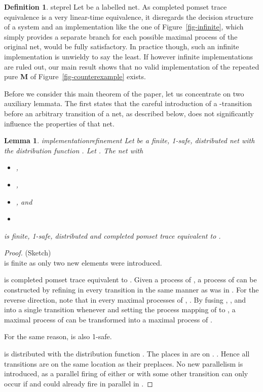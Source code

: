 \documentclass[submission,copyright,creativecommons]{eptcs}
\newtheorem{lemma}{Lemma}
\theoremstyle{definition}
\newtheorem{definition}{Definition}
\def\figurename{Figure}
\newcommand{\reffig}[1]{\figurename~\ref{fig-#1}}
\begin{document}
\begin{definition}{steprel}{
  Let  be a labelled net.
  }
As completed pomset trace equivalence is a very linear-time equivalence,
it disregards the decision structure of a system and
an implementation like the one of \reffig{infinite}, which simply provides a separate branch for each possible maximal process of the original net, would be fully
satisfactory. In practice though, such an infinite implementation is unwieldy to
say the least. If however infinite implementations are ruled out,
our main result shows that
no valid implementation
of the repeated pure \textbf{M} of \reffig{counterexample} exists.

Before we consider this main theorem of the paper, let us concentrate on two
auxiliary lemmata. The first
states that the careful introduction of a
-transition before an arbitrary transition of a net, as described below,
does not significantly influence the properties of that net.

\begin{lemma}{implementationrefinement}{
  Let  be a finite, 1-safe, distributed net with
  the distribution function . Let .
  }
  The net  with
  \begin{itemize}\vspace{-1ex}
    \item ,
    \item ,
    \item , and
    \item 
  \end{itemize}
  is finite, 1-safe, distributed and completed pomset trace equivalent to .
\end{lemma}

\begin{proof}(Sketch)\\
   is finite as only two new elements were introduced.

   is completed pomset trace equivalent to . Given a process  of , a process of  can be constructed by refining in  every
  transition  in the same manner as  was in .
  For the reverse direction, note that in every maximal processes of ,
  .
  By fusing , , and  into a single
  transition  whenever  and setting the process mapping of  to ,
  a maximal process of  can be transformed into a maximal process of .

  For the same reason,  is also 1-safe.

  \noindent
   is distributed with the distribution function
  .
  The places in  are on . .
  Hence all transitions are on the same location as their preplaces.
  No new parallelism is introduced, as a parallel firing of either  or 
  with some other transition  can only occur if  and  could already fire in parallel
  in .
\end{proof}


\end{definition}
\end{document}
